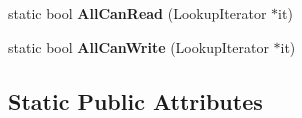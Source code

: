 \begin{DoxyCompactItemize}
\item 
static bool {\bfseries All\+Can\+Read} (Lookup\+Iterator $\ast$it)\hypertarget{classv8_1_1internal_1_1_j_s_object_a2519dad54d82b7dcd1e1c5325b7dd445}{}\label{classv8_1_1internal_1_1_j_s_object_a2519dad54d82b7dcd1e1c5325b7dd445}

\item 
static bool {\bfseries All\+Can\+Write} (Lookup\+Iterator $\ast$it)\hypertarget{classv8_1_1internal_1_1_j_s_object_a3aa961becd98dcad9973ea001f71f99b}{}\label{classv8_1_1internal_1_1_j_s_object_a3aa961becd98dcad9973ea001f71f99b}

\end{DoxyCompactItemize}
\subsection*{Static Public Attributes}
